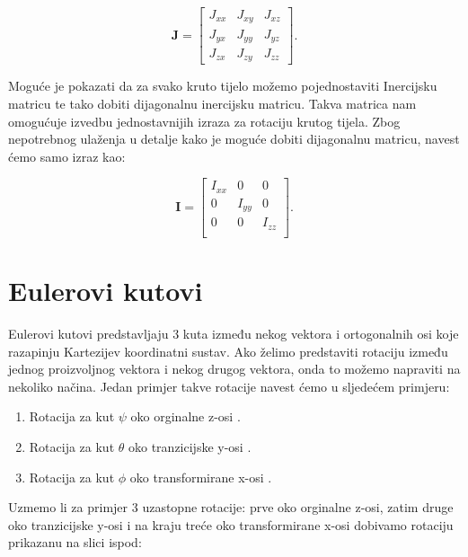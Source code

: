 \documentclass[times, utf8, diplomski, numeric]{templates/template}
\begin{document}
{{        \begin{equation}
        \textbf{J} = 
        \begin{bmatrix}
            J_{xx} & J_{xy} & J_{xz} \\
            J_{yx} & J_{yy} & J_{yz} \\
            J_{zx} & J_{zy} & J_{zz}
        \end{bmatrix}
        .
        \end{equation}

        Moguće je pokazati da za svako kruto tijelo možemo pojednostaviti Inercijsku matricu te tako dobiti dijagonalnu inercijsku matricu. Takva matrica nam omogućuje izvedbu jednostavnijih izraza za rotaciju krutog tijela. Zbog nepotrebnog ulaženja u detalje kako je moguće dobiti dijagonalnu matricu, navest ćemo samo izraz kao:

        \begin{equation}
        \textbf{I} = 
        \begin{bmatrix}
            I_{xx} & 0      & 0 \\
            0      & I_{yy} & 0 \\
            0      & 0      & I_{zz} \\
        \end{bmatrix}
        .
        \end{equation}
    }

    \section{Eulerovi kutovi}{
        Eulerovi kutovi predstavljaju 3 kuta između nekog vektora i ortogonalnih osi koje razapinju Kartezijev koordinatni sustav. Ako želimo predstaviti rotaciju između jednog proizvoljnog vektora i nekog drugog vektora, onda to možemo napraviti na nekoliko načina. Jedan primjer takve rotacije navest ćemo u sljedećem primjeru:

        \begin{enumerate}
            \item Rotacija za kut $\psi$ oko orginalne z-osi .
            \item Rotacija za kut $\theta$ oko tranzicijske y-osi .
            \item Rotacija za kut $\phi$ oko transformirane x-osi .
        \end{enumerate}

        Uzmemo li za primjer 3 uzastopne rotacije: prve oko orginalne z-osi, zatim druge oko tranzicijske y-osi i na kraju treće oko transformirane x-osi dobivamo rotaciju prikazanu na slici ispod: 

}}
\end{document}
